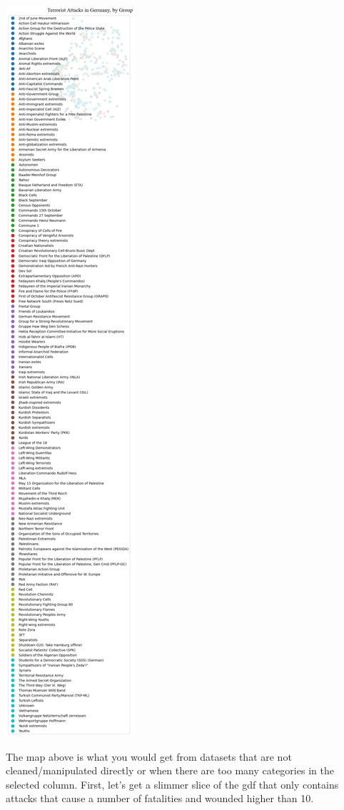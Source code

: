 \documentclass[
  letterpaper,
  DIV=11,
  numbers=noendperiod]{scrreprt}
\begin{document}
\includegraphics{labs/w02_maps_files/figure-pdf/cell-42-output-2.png}

The map above is what you would get from datasets that are not
cleaned/manipulated directly or when there are too many categories in
the selected column. First, let's get a slimmer slice of the gdf that
only contains attacks that cause a number of fatalities and wounded
higher than 10.
\end{document}

